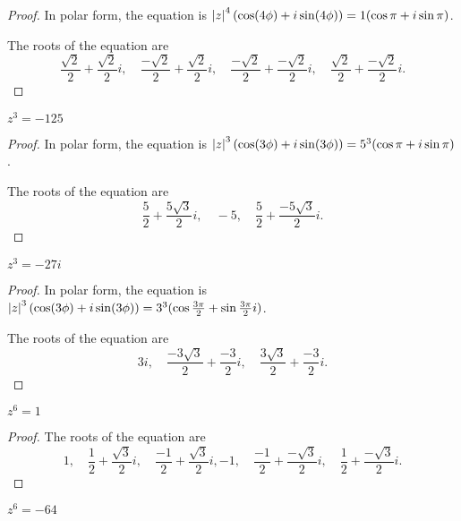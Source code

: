 \begin{proof}
    In polar form, the equation is $\left\vert{z}\right\vert^{4}(\cos (4\phi) + i\sin (4\phi)) = 1(\cos\pi + i\sin\pi)$.

    The roots of the equation are
    \[
        \frac{\sqrt{2}}{2} + \frac{\sqrt{2}}{2}i,\quad \frac{-\sqrt{2}}{2} + \frac{\sqrt{2}}{2}i,\quad \frac{-\sqrt{2}}{2} + \frac{-\sqrt{2}}{2}i,\quad \frac{\sqrt{2}}{2} + \frac{-\sqrt{2}}{2}i.
    \]
\end{proof}

\newpage
\begin{exercise}
    $z^{3} = -125$
\end{exercise}

\begin{proof}
    In polar form, the equation is $\left\vert{z}\right\vert^{3}(\cos (3\phi) + i\sin (3\phi)) = 5^{3}(\cos\pi + i\sin\pi)$.

    The roots of the equation are
    \[
        \frac{5}{2} + \frac{5\sqrt{3}}{2}i,\quad -5,\quad \frac{5}{2} + \frac{-5\sqrt{3}}{2}i.
    \]
\end{proof}

\newpage
\begin{exercise}
    $z^{3} = -27i$
\end{exercise}

\begin{proof}
    In polar form, the equation is $\left\vert{z}\right\vert^{3}(\cos (3\phi) + i\sin (3\phi)) = 3^{3}(\cos\frac{3\pi}{2} + \sin\frac{3\pi}{2}i)$.

    The roots of the equation are
    \[
        3i,\quad \frac{-3\sqrt{3}}{2} + \frac{-3}{2}i,\quad\frac{3\sqrt{3}}{2} + \frac{-3}{2}i.
    \]
\end{proof}

\newpage
\begin{exercise}
    $z^{6} = 1$
\end{exercise}

\begin{proof}
    The roots of the equation are
    \[
        1,\quad \frac{1}{2} + \frac{\sqrt{3}}{2}i,\quad \frac{-1}{2} + \frac{\sqrt{3}}{2}i, -1,\quad \frac{-1}{2} + \frac{-\sqrt{3}}{2}i,\quad \frac{1}{2} + \frac{-\sqrt{3}}{2}i.
    \]
\end{proof}

\newpage
\begin{exercise}
    $z^{6} = -64$
\end{exercise}

